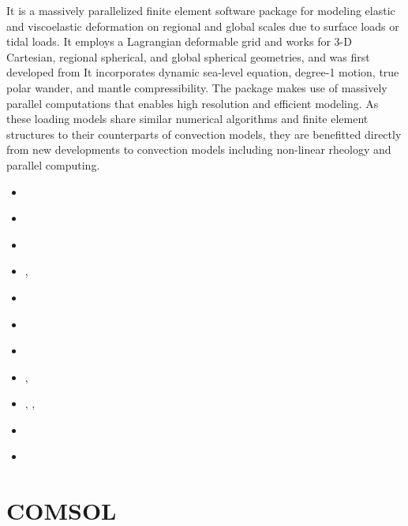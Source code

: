 It is a massively parallelized finite element software package for modeling elastic 
and viscoelastic deformation on regional and global scales due to 
surface loads or tidal loads. 
It employs a Lagrangian deformable grid and works for 3-D Cartesian, 
regional spherical, and global spherical geometries, and was first developed from \citcoms
It incorporates dynamic sea-level equation, degree-1 motion, true polar wander, 
and mantle compressibility. The package makes use of massively parallel computations 
that enables high resolution and efficient modeling. 
As these loading models share similar numerical algorithms and finite element 
structures to their counterparts of convection models, they are benefitted directly 
from new developments to convection models including non-linear rheology and parallel computing. 

\begin{small}
\begin{itemize}
\item[\twothousandthree]      \textcite{zhpw03}
\item[\twothousandfive]       \textcite{pazw05}
\item[\twothousandtwelve]     \textcite{zhqa12}
\item[\twothousandthirteen]   \textcite{awzh13}, \textcite{zhwa13}
\item[\twothousandfourteen]   \textcite{awzh14}
\item[\twothousandsixteen]    \textcite{qizw16}
\item[\twothousandtwenty]     \textcite{bezw20}
\item[\twothousandtwentyone]  \textcite{bezh21a}, \textcite{bezh21b}
\item[\twothousandtwentytwo]  \textcite{kaza22}, \textcite{bezw22}, \textcite{zhka22}
\item[\twothousandtwentyfour] \textcite{fizm24} 
\item[\twothousandtwentyfive] 
\end{itemize}
\end{small}


\section{COMSOL} 

